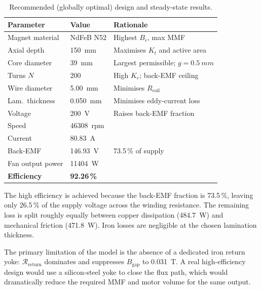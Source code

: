 \documentclass[10pt, twocolumn, a4paper]{article}
\begin{document}
\begin{table}[H]
  \centering
  \caption{Recommended (globally optimal) design and steady-state results.}
  \label{tab:rec}
  \small
  \setlength{\tabcolsep}{6pt}
  \begin{tabular}{@{} L{2.2cm} L{1.8cm} L{3cm} @{}}
    \toprule
    \textbf{Parameter} & \textbf{Value} & \textbf{Rationale} \\
    \midrule
    Magnet material  & NdFeB N52        & Highest $B_r$, max MMF \\
    Axial depth      & \SI{150}{mm}     & Maximises $K_t$ and active area \\
    Core diameter    & \SI{39}{mm}      & Largest permissible; $g = \SI{0.5}{mm}$ \\
    Turns $N$        & 200              & High $K_e$; back-EMF ceiling \\
    Wire diameter    & \SI{5.00}{mm}    & Minimises $R_\text{coil}$ \\
    Lam.\ thickness  & \SI{0.050}{mm}   & Minimises eddy-current loss \\
    Voltage          & \SI{200}{V}      & Raises back-EMF fraction \\
    \midrule
    Speed            & \SI{46308}{rpm}  & \\
    Current          & \SI{80.83}{A}    & \\
    Back-EMF         & \SI{146.93}{V}   & 73.5\,\% of supply \\
    Fan output power & \SI{11404}{W}    & \\
    \textbf{Efficiency} & \textbf{92.26\,\%} & \\
    \bottomrule
  \end{tabular}
\end{table}

The high efficiency is achieved because the back-EMF fraction is 73.5\,\%,
leaving only 26.5\,\% of the supply voltage across the winding resistance.
The remaining loss is split roughly equally between copper dissipation
(\SI{484.7}{W}) and mechanical friction (\SI{471.8}{W}).
Iron losses are negligible at the chosen lamination thickness.

The primary limitation of the model is the absence of a dedicated iron
return yoke: $\mathcal{R}_\text{return}$ dominates and suppresses
$B_\text{gap}$ to \SI{0.031}{T}.  A real high-efficiency design would use
a silicon-steel yoke to close the flux path, which would dramatically
reduce the required MMF and motor volume for the same output.
\end{document}
